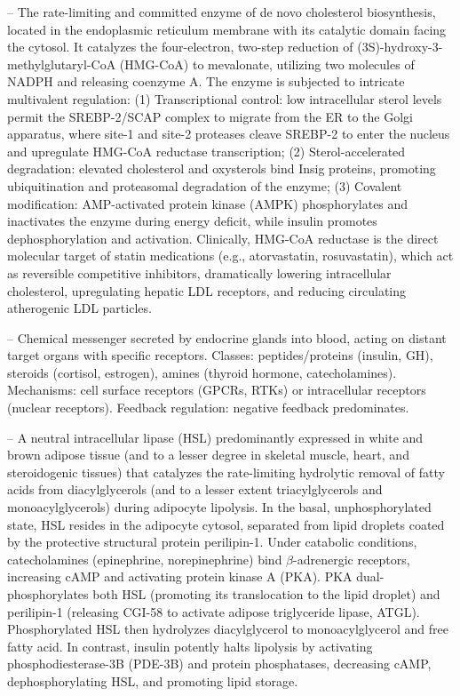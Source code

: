 -- The rate-limiting and committed enzyme of de novo cholesterol biosynthesis, located in the endoplasmic reticulum membrane with its catalytic domain facing the cytosol. It catalyzes the four-electron, two-step reduction of (3S)-hydroxy-3-methylglutaryl-CoA (HMG-CoA) to mevalonate, utilizing two molecules of NADPH and releasing coenzyme A. The enzyme is subjected to intricate multivalent regulation: (1) Transcriptional control: low intracellular sterol levels permit the SREBP-2/SCAP complex to migrate from the ER to the Golgi apparatus, where site-1 and site-2 proteases cleave SREBP-2 to enter the nucleus and upregulate HMG-CoA reductase transcription; (2) Sterol-accelerated degradation: elevated cholesterol and oxysterols bind Insig proteins, promoting ubiquitination and proteasomal degradation of the enzyme; (3) Covalent modification: AMP-activated protein kinase (AMPK) phosphorylates and inactivates the enzyme during energy deficit, while insulin promotes dephosphorylation and activation. Clinically, HMG-CoA reductase is the direct molecular target of statin medications (e.g., atorvastatin, rosuvastatin), which act as reversible competitive inhibitors, dramatically lowering intracellular cholesterol, upregulating hepatic LDL receptors, and reducing circulating atherogenic LDL particles.

-- Chemical messenger secreted by endocrine glands into blood, acting on distant target organs with specific receptors. Classes: peptides/proteins (insulin, GH), steroids (cortisol, estrogen), amines (thyroid hormone, catecholamines). Mechanisms: cell surface receptors (GPCRs, RTKs) or intracellular receptors (nuclear receptors). Feedback regulation: negative feedback predominates.

-- A neutral intracellular lipase (HSL) predominantly expressed in white and brown adipose tissue (and to a lesser degree in skeletal muscle, heart, and steroidogenic tissues) that catalyzes the rate-limiting hydrolytic removal of fatty acids from diacylglycerols (and to a lesser extent triacylglycerols and monoacylglycerols) during adipocyte lipolysis. In the basal, unphosphorylated state, HSL resides in the adipocyte cytosol, separated from lipid droplets coated by the protective structural protein perilipin-1. Under catabolic conditions, catecholamines (epinephrine, norepinephrine) bind $\beta$-adrenergic receptors, increasing cAMP and activating protein kinase A (PKA). PKA dual-phosphorylates both HSL (promoting its translocation to the lipid droplet) and perilipin-1 (releasing CGI-58 to activate adipose triglyceride lipase, ATGL). Phosphorylated HSL then hydrolyzes diacylglycerol to monoacylglycerol and free fatty acid. In contrast, insulin potently halts lipolysis by activating phosphodiesterase-3B (PDE-3B) and protein phosphatases, decreasing cAMP, dephosphorylating HSL, and promoting lipid storage.

